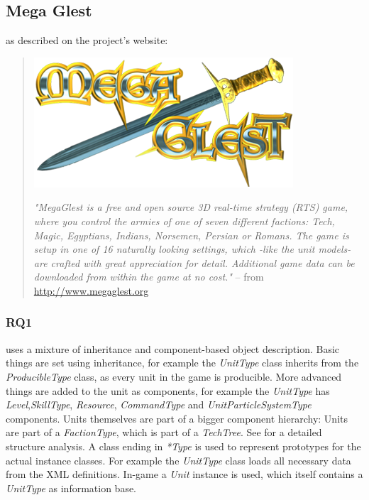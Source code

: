 \subsection{Mega Glest}
\GLEST{} as described on the project's website:
\begin{quote}

\begin{center}\includegraphics[scale=0.5]{pics/glestlogo}\end{center}

\textit{"MegaGlest is a free and open source 3D real-time strategy (RTS) game, where you control the armies of one of
seven different factions: Tech, Magic, Egyptians, Indians, Norsemen, Persian or Romans. The game is setup in one of 16
naturally looking settings, which -like the unit models- are crafted with great appreciation for detail. Additional game
data can be downloaded from within the game at no cost."} -- from \url{http://www.megaglest.org}
\end{quote}

\subsubsection{RQ1}
\GLEST{} uses a mixture of inheritance and component-based object description. Basic things are set using
inheritance, for example the \textit{UnitType} class inherits from the \textit{ProducibleType} class, as every unit in
the game is producible. More advanced things are added to the unit as components, for example the \textit{UnitType} has
\textit{Level},\textit{SkillType}, \textit{Resource}, \textit{CommandType} and \textit{UnitParticleSystemType}
components. Units themselves are part of a bigger component hierarchy: Units are part of a \textit{FactionType}, which
is part of a \textit{TechTree}. See  for a detailed structure analysis. A class ending in
\textit{*Type} is used to represent prototypes for the actual instance classes. For example the \textit{UnitType} class loads all
necessary data from the XML definitions. In-game a \textit{Unit} instance is used, which itself contains a
\textit{UnitType} as information base.


